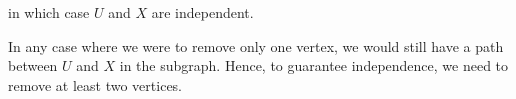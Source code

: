 \documentclass[11pt]{report}
\newcommand{\be}{\begin{enumerate}}
\newcommand{\ee}{\end{enumerate}}
\newcommand{\ind}{\mathbbm{1}}
\begin{document}
\begin{enumerate}[1.]
\begin{enumerate}
\begin{center}
		            \end{center}
		            in which case $U$ and $X$ are independent.

		            In any case where we were to remove only one vertex, we would still have a path between $U$ and $X$ in the subgraph. Hence, to guarantee independence, we need to remove at least two vertices.
		            \color{black}

	      \end{enumerate}



\end{enumerate}
\end{document}
